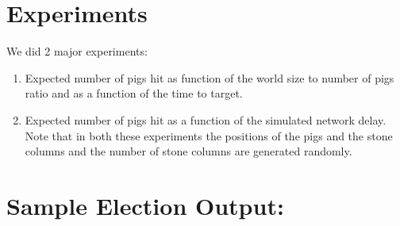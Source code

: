 \documentclass[]{article}
\begin{document}
\section{Experiments}
We did 2 major experiments:
\begin{enumerate}[1.]
\item
  Expected number of pigs hit as function of the world size to number of pigs ratio and as a function of the time to target. 
\item
  Expected number of pigs hit as a function of the simulated network delay. Note that in both these experiments the positions of the pigs and the stone columns and the number of stone columns are generated randomly. 
\end{enumerate} 

\section{Sample Election Output:}
\end{document}
